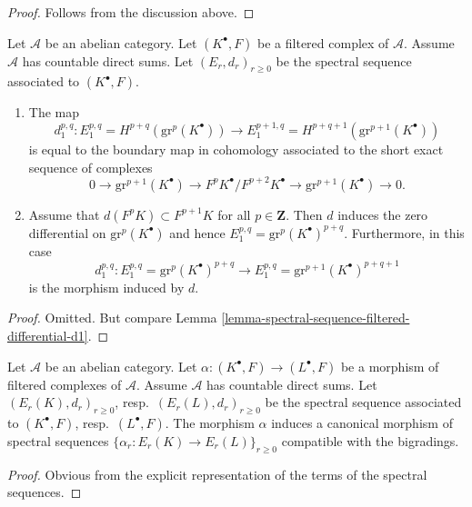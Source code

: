 \begin{proof}
Follows from the discussion above.
\end{proof}

\begin{lemma}
\label{lemma-spectral-sequence-filtered-complex-d1}
Let $\mathcal{A}$ be an abelian category.
Let $(K^\bullet, F)$ be a filtered complex of $\mathcal{A}$.
Assume $\mathcal{A}$ has countable direct sums.
Let $(E_r, d_r)_{r \geq 0}$ be the spectral sequence
associated to $(K^\bullet, F)$.
\begin{enumerate}
\item The map
$$
d_1^{p, q} :
E_1^{p, q} = H^{p + q}(\text{gr}^p(K^\bullet))
\longrightarrow
E_1^{p + 1, q} = H^{p + q + 1}(\text{gr}^{p + 1}(K^\bullet))
$$
is equal to the boundary map in cohomology associated to the short
exact sequence of complexes
$$
0 \to \text{gr}^{p + 1}(K^\bullet) \to
F^pK^\bullet/F^{p + 2}K^\bullet \to \text{gr}^{p + 1}(K^\bullet) \to 0.
$$
\item Assume that $d(F^pK) \subset F^{p + 1}K$ for all $p \in \mathbf{Z}$.
Then $d$ induces the zero differential on $\text{gr}^p(K^\bullet)$
and hence
$E_1^{p, q} = \text{gr}^p(K^\bullet)^{p + q}$.
Furthermore, in this case
$$
d_1^{p, q} :
E_1^{p, q} = \text{gr}^p(K^\bullet)^{p + q}
\longrightarrow
E_1^{p, q} = \text{gr}^{p + 1}(K^\bullet)^{p + q + 1}
$$
is the morphism induced by $d$.
\end{enumerate}
\end{lemma}

\begin{proof}
Omitted. But compare
Lemma \ref{lemma-spectral-sequence-filtered-differential-d1}.
\end{proof}

\begin{lemma}
\label{lemma-spectral-sequence-filtered-complex-functorial}
Let $\mathcal{A}$ be an abelian category.
Let $\alpha : (K^\bullet, F) \to (L^\bullet, F)$ be a morphism of
filtered complexes of $\mathcal{A}$. Assume $\mathcal{A}$ has
countable direct sums. Let $(E_r(K), d_r)_{r \geq 0}$,
resp.\ $(E_r(L), d_r)_{r \geq 0}$ be the spectral sequence associated
to $(K^\bullet, F)$, resp.\ $(L^\bullet, F)$.
The morphism $\alpha$ induces a canonical morphism of spectral
sequences $\{\alpha_r : E_r(K) \to E_r(L)\}_{r \geq 0}$ compatible
with the bigradings.
\end{lemma}

\begin{proof}
Obvious from the explicit representation of the terms of the
spectral sequences.
\end{proof}

